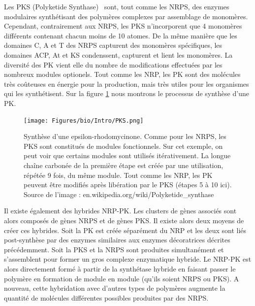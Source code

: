 \label{PKS_p}

Les PKS (Polyketide Synthase)~\cite{shen_polyketide_2003,staunton_polyketide_2001} sont, tout comme les NRPS, des enzymes modulaires synthétisant des polymères complexes par assemblage de monomères.
Cependant, contrairement aux NRPS, les PKS n'incorporent que 4 monomères différents contenant chacun moins de 10 atomes.
De la même manière que les domaines C, A et T des NRPS capturent des monomères spécifiques, les domaines ACP, At et KS condenssent, capturent et lient les monomères.
La diversité des PK vient elle du nombre de modifications effectuées par les nombreux modules optionels.
Tout comme les NRP, les PK sont des molécules très coûteuses en énergie pour la production, mais très utiles pour les organismes qui les synthétisent.
Sur la figure \ref{pks} nous montrons le processus de synthèse d'une PK.

\begin{figure}
  \begin{center}
    \texttt{[image: Figures/bio/Intro/PKS.png]}
    \caption{\label{pks}Synthèse d'une epsilon-rhodomycinone.
    Comme pour les NRPS, les PKS sont constitués de modules fonctionnels.
    Sur cet exemple, on peut voir que certains modules sont utilisés itérativement.
    La longue chaîne carbonée de la première étape est créée par une utilisation, répétée 9 fois, du même module.
    Tout comme les NRP, les PK peuvent être modifiés après libération par le PKS (étapes 5 à 10 ici).
    Source de l'image : en.wikipedia.org/wiki/Polyketide\_synthase}
  \end{center}
\end{figure}

Il existe également des hybrides NRP-PK.
Les clusters de gènes associés sont alors composés de gènes NRPS et de gènes PKS.
Il existe alors deux moyens de créer ces hybrides.
Soit la PK est créée séparément du NRP et les deux sont liés post-synthèse par des enzymes similaires aux enzymes décoratrices décrites précédemment.
Soit la PKS et la NRPS sont produites simultanément et s'assemblent pour former un gros complexe enzymatique hybride.
Le NRP-PK est alors directement formé à partir de la synthétase hybride en faisant passer le polymère en formation de module en module (qu'ils soient NRPS ou PKS).
A nouveau, cette hybridation avec d'autres types de polymères augmente la quantité de molécules différentes possibles produites par des NRPS.









